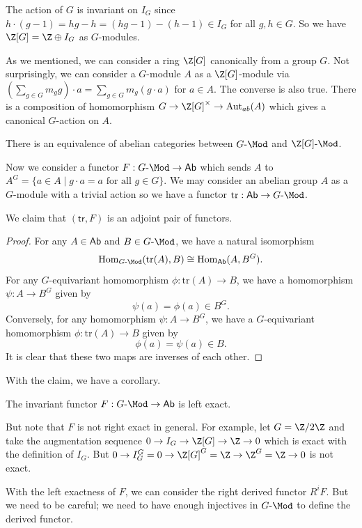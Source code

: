 The action of $G$ is invariant on $I_G$ since $h\cdot (g-1) = hg - h = (hg - 1) - (h - 1) \in I_G$ for all $g, h \in G$.
So we have $\Z[G] = \Z \oplus I_G$ as $G$-modules.

As we mentioned, we can consider a ring $\Z[G]$ canonically from a group $G$.
Not surprisingly, we can consider a $G$-module $A$ as a $\Z[G]$-module
via $(\sum_{g \in G} m_g g) \cdot a = \sum_{g \in G} m_g (g \cdot a)$ for $a \in A$.
The converse is also true.
There is a composition of homomorphism $G \to \Z[G]^{\times} \to \mathrm{Aut}_{ab}(A)$
which gives a canonical $G$-action on $A$.

\begin{proposition}
    There is an equivalence of abelian categories between $G\text{-}\Mod$ and $\Z[G]\text{-}\Mod$.
\end{proposition}

Now we consider a functor $F: G\text{-}\Mod \to \mathsf{Ab}$
which sends $A$ to $A^G = \{a \in A \mid g\cdot a = a \text{ for all } g \in G\}$.
We may consider an abelian group $A$ as a $G$-module with a trivial action
so we have a functor $\mathrm{tr}: \mathsf{Ab} \to G\text{-}\Mod$.
\begin{claim}
We claim that $(\mathsf{tr}, F)$ is an adjoint pair of functors.
\end{claim}
\begin{proof}
    For any $A \in \mathsf{Ab}$ and $B \in G\text{-}\Mod$, we have a natural isomorphism
    \[
        \mathrm{Hom}_{G\text{-}\Mod}(\mathrm{tr}(A), B) \cong \mathrm{Hom}_{\mathsf{Ab}}(A, B^G).
    \]
    For any $G$-equivariant homomorphism $\phi: \mathrm{tr}(A) \to B$,
    we have a homomorphism $\psi: A \to B^G$ given by
    \[
        \psi(a) = \phi(a) \in B^G.
    \]
    Conversely, for any homomorphism $\psi: A \to B^G$,
    we have a $G$-equivariant homomorphism $\phi: \mathrm{tr}(A) \to B$ given by
    \[
        \phi(a) = \psi(a) \in B.
    \]
    It is clear that these two maps are inverses of each other.
\end{proof}

With the claim, we have a corollary.
\begin{corollary}
    The invariant functor $F: G\text{-}\Mod \to \mathsf{Ab}$ is left exact.
\end{corollary}

But note that $F$ is not right exact in general. For example, let $G = \Z/2\Z$
and take the augmentation sequence $0 \to I_G \to \Z[G] \to \Z \to 0$
which is exact with the definition of $I_G$.
But $0 \to I_G^G = 0 \to \Z[G]^G = \Z \to \Z^G = \Z \to 0$ is not exact.

With the left exactness of $F$, we can consider the right derived functor $R^iF$.
But we need to be careful; we need to have enough injectives in $G\text{-}\Mod$ to define the derived functor.